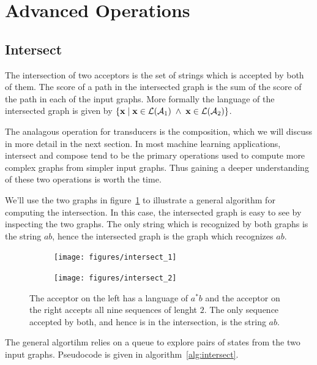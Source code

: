 \section{Advanced Operations}
\label{sec:advanced_operations}

\subsection{Intersect}

The intersection of two acceptors is the set of strings which is accepted by
both of them. The score of a path in the intersected graph is the sum of the
score of the path in each of the input graphs. More formally the language of
the intersected graph is given by $\{ {\bf x} \mid {\bf x} \in \mathcal{L}(\mathcal{A}_1) \;\land\; {\bf x}
\in \mathcal{L}(\mathcal{A}_2)\}$.

The analagous operation for transducers is the composition, which we will
discuss in more detail in the next section. In most machine learning
applications, intersect and compose tend to be the primary operations used to
compute more complex graphs from simpler input graphs. Thus gaining a deeper
understanding of these two operations is worth the time.

We'll use the two graphs in figure~\ref{fig:intersect_inputs} to illustrate a
general algorithm for computing the intersection. In this case, the intersected
graph is easy to see by inspecting the two graphs. The only string which is
recognized by both graphs is the string $ab$, hence the intersected graph is
the graph which recognizes $ab$.

\begin{figure}
    \centering
    \begin{subfigure}[b]{0.48\textwidth}
        \centering
        \texttt{[image: figures/intersect\_1]}
    \end{subfigure}
    \begin{subfigure}[b]{0.48\textwidth}
        \centering
        \texttt{[image: figures/intersect\_2]}
    \end{subfigure}
    \caption{The acceptor on the left has a language of $a^*b$ and the acceptor
    on the right accepts all nine sequences of lenght $2$. The only sequence
    accepted by both, and hence is in the intersection, is the string $ab$.}
    \label{fig:intersect_inputs}
\end{figure}

The general algortihm relies on a queue to explore pairs of states from the two
input graphs. Pseudocode is given in algorithm~\ref{alg:intersect}.

